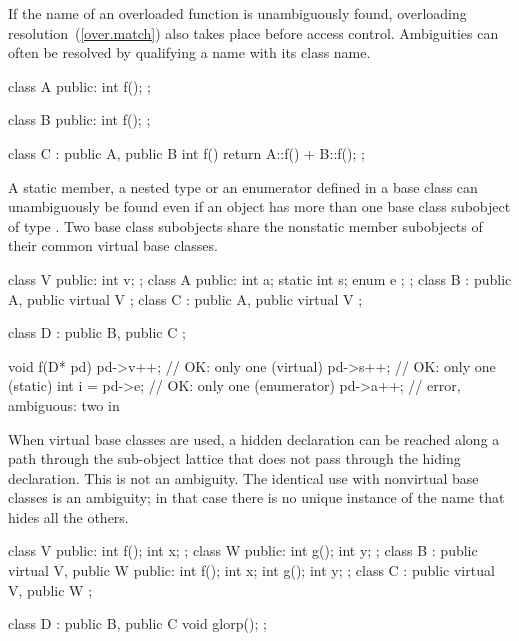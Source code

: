 \exitexampleb

\pnum
{}%
If the name of an overloaded function is unambiguously found,
overloading resolution~(\ref{over.match}) also takes place before access
control.
%
%
%
Ambiguities can often be resolved by qualifying a name with its class name.
\enterexample
\begin{codeblock}
class A {
public:
    int f();
};

\end{codeblock}
\begin{codeblock}
class B {
public:
    int f();
};

\end{codeblock}
\begin{codeblock}
class C : public A, public B {
    int f() { return A::f() + B::f(); }
};
\end{codeblock}
\exitexampleb

\pnum
A static member, a nested type or an enumerator defined in a base class
 can unambiguously be found even if an object has more than one
base class subobject of type . Two base class subobjects share
the nonstatic member subobjects of their common virtual base classes.
\enterexample
\begin{codeblock}
class V { public: int v; };
class A {
public:
    int a;
    static int   s;
    enum { e };
};
class B : public A, public virtual V {};
class C : public A, public virtual V {};

class D : public B, public C { };

void f(D* pd)
{
    pd->v++;			// OK: only one  (virtual)
    pd->s++;			// OK: only one  (static)
    int i = pd->e;		// OK: only one  (enumerator)
    pd->a++;			// error, ambiguous: two  in 
}
\end{codeblock}
\exitexampleb

\pnum
{}%
When virtual base classes are used, a hidden declaration can be reached
along a path through the sub-object lattice that does not pass through
the hiding declaration. This is not an ambiguity. The identical use with
nonvirtual base classes is an ambiguity; in that case there is no
unique instance of the name that hides all the others.
\enterexample
\begin{codeblock}
class V { public: int f();  int x; };
class W { public: int g();  int y; };
class B : public virtual V, public W
{
public:
    int f();  int x;
    int g();  int y;
};
class C : public virtual V, public W { };

class D : public B, public C { void glorp(); };
\end{codeblock}

